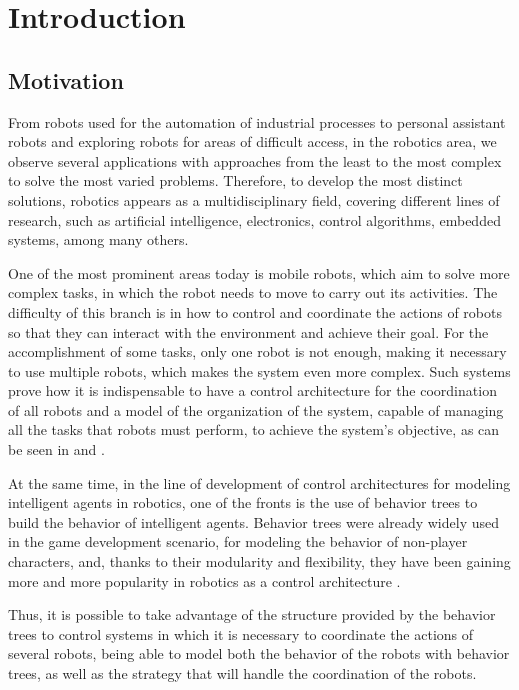 \chapter{Introduction}

\section{Motivation}

From robots used for the automation of industrial processes to personal assistant robots and exploring robots for areas of difficult access, in the robotics area, we observe several applications with approaches from the least to the most complex to solve the most varied problems. Therefore, to develop the most distinct solutions, robotics appears as a multidisciplinary field, covering different lines of research, such as artificial intelligence, electronics, control algorithms, embedded systems, among many others.

One of the most prominent areas today is mobile robots, which aim to solve more complex tasks, in which the robot needs to move to carry out its activities. The difficulty of this branch is in how to control and coordinate the actions of robots so that they can interact with the environment and achieve their goal. For the accomplishment of some tasks, only one robot is not enough, making it necessary to use multiple robots, which makes the system even more complex. Such systems prove how it is indispensable to have a control architecture for the coordination of all robots and a model of the organization of the system, capable of managing all the tasks that robots must perform, to achieve the system's objective, as can be seen in \cite{ACMultiplosRobos} and \cite{Moise}.

At the same time, in the line of development of control architectures for modeling intelligent agents in robotics, one of the fronts is the use of behavior trees to build the behavior of intelligent agents. Behavior trees were already widely used in the game development scenario, for modeling the behavior of non-player characters, and, thanks to their modularity and flexibility, they have been gaining more and more popularity in robotics as a control architecture \cite{BTsInRobotics, BTsAndFSMApplications}.

Thus, it is possible to take advantage of the structure provided by the behavior trees to control systems in which it is necessary to coordinate the actions of several robots, being able to model both the behavior of the robots with behavior trees, as well as the strategy that will handle the coordination of the robots.

